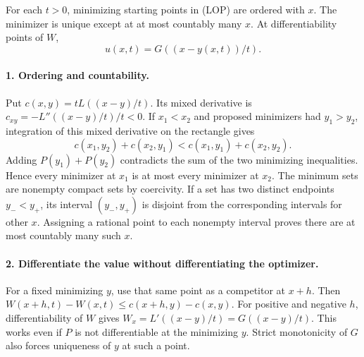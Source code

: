 \begin{theorem}\label{thm:3-lo}
For each $t>0$, minimizing starting points in (LOP) are ordered with $x$.
The minimizer is unique except at at most countably many $x$.
At differentiability points of $W$,
\[
 \boxed{u(x,t)=G((x-y(x,t))/t).}
 \tag{LO}
\]
\end{theorem}
\begin{expandedproof}
\paragraph{1. Ordering and countability.}
Put $c(x,y)=tL((x-y)/t)$.
Its mixed derivative is $c_{xy}=-L''((x-y)/t)/t<0$.
If $x_1<x_2$ and proposed minimizers had $y_1>y_2$,
integration of this mixed derivative on the rectangle gives
\[
 c(x_1,y_2)+c(x_2,y_1)<c(x_1,y_1)+c(x_2,y_2).
\]
Adding $P(y_1)+P(y_2)$ contradicts the sum of the two minimizing
inequalities. Hence every minimizer at $x_1$ is at most every minimizer
at $x_2$.
The minimum sets are nonempty compact sets by coercivity.
If a set has two distinct endpoints $y_-<y_+$, its interval
$(y_-,y_+)$ is disjoint from the corresponding intervals for other $x$.
Assigning a rational point to each nonempty interval proves there are
at most countably many such $x$.

\Needspace{45mm}
\paragraph{2. Differentiate the value without differentiating the optimizer.}
For a fixed minimizing $y$, use that same point as a competitor at
$x+h$. Then
$W(x+h,t)-W(x,t)\leq c(x+h,y)-c(x,y)$.
For positive and negative $h$, differentiability of $W$ gives
$W_x=L'((x-y)/t)=G((x-y)/t)$.
This works even if $P$ is not differentiable at the minimizing $y$.
Strict monotonicity of $G$ also forces uniqueness of $y$ at such a point.
\end{expandedproof}
\Needspace{45mm}

